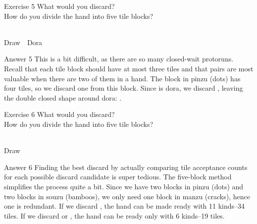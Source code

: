 \vfill


\begin{itembox}[l]{Exercise 5}
What would you discard? \\
\vsp
How do you divide the hand into five tile blocks? 

\bp
{}~~\\
\hfill\footnotesize{Draw~~{\jap Dora}~~~~~~~}
\ep
\end{itembox}

\newpage

\begin{itembox}[r]{Answer 5}
\emj
This is a bit difficult, as there are so many closed-wait protoruns. Recall that each tile block should have at most three tiles and that pairs are most valuable when there are two of them in a hand. 
The block in {\jap pinzu} (dots) has four tiles, so we discard one from this block. Since {\LARGE{}} is {\jap dora}, we discard {\LARGE{}}, leaving the double closed shape around {\jap dora}: {\LARGE{}}. 
\end{itembox}

\vfill

\begin{itembox}[l]{Exercise 6}
What would you discard? \\
\vsp
How do you divide the hand into five tile blocks? 

\bp
{}~\\
\hfill\footnotesize{Draw~~~~~~~~~~~}
\ep
\end{itembox}

\newpage

\begin{itembox}[r]{Answer 6}
\emj
Finding the best discard by actually comparing tile acceptance counts for each possible discard candidate is super tedious. The five-block method simplifies the process quite a bit. Since we have two blocks in {\jap pinzu} (dots) and two blocks in {\jap souzu} (bamboos), we only need one block in {\jap manzu} (cracks), hence one {\LARGE{}} is redundant. If we discard {\LARGE{}}, the hand can be made ready with 11 kinds--34 tiles. If we discard {\LARGE{} } or {\LARGE{}}, the hand can be ready only with 6 kinds--19 tiles. 
\end{itembox}

